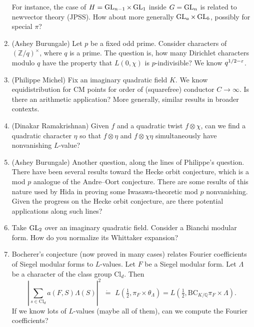 \documentclass[reqno]{amsart} 
\begin{document}
\begin{enumerate}
  For instance, the case of $H = \operatorname{GL}_{n-1} \times \operatorname{GL}_1$ inside $G = \operatorname{GL}_{n}$ is related to newvector theory (JPSS).  How about more generally $\operatorname{GL}_a \times \operatorname{GL}_b$, possibly for special $\pi$?
\item\label{enumerate:cnej3kgqgj} (Ashey Burungale) Let $p$ be a fixed odd prime.  Consider characters of $(\mathbb{Z} / q)^\times$, where $q$ is a prime.  The question is, how many Dirichlet characters modulo $q$ have the property that $L(0, \chi )$ is $p$-indivisible?  We know $q^{1/2 - \varepsilon}$.
\item\label{enumerate:cnej3kgrc4} (Philippe Michel) Fix an imaginary quadratic field $K$.  We know equidistribution for CM points for order of (squarefree) conductor $C \rightarrow \infty$.  Is there an arithmetic application?  More generally, similar results in broader contexts.
\item\label{enumerate:cnej3kgr45} (Dinakar Ramakrishnan) Given $f$ and a quadratic twist $f \otimes \chi$, can we find a quadratic character $\eta$ so that $f \otimes \eta$ and $f \otimes \chi \eta$ simultaneously have nonvanishing $L$-value?
\item\label{enumerate:cnej3kgsw6} (Ashey Burungale) Another question, along the lines of Philippe's question.  There have been several results toward the Hecke orbit conjecture, which is a mod $p$ analogue of the Andre--Oort conjecture.  There are some results of this nature used by Hida in proving some Iwasawa-theoretic mod $p$ nonvanishing.  Given the progress on the Hecke orbit conjecture, are there potential applications along such lines?
\item\label{enumerate:cnej3kgmi0} Take $\operatorname{GL}_2$ over an imaginary quadratic field.  Consider a Bianchi modular form.  How do you normalize its Whittaker expansion?
\item\label{enumerate:cnej3kglp3} Bocherer's conjecture (now proved in many cases) relates Fourier coefficients of Siegel modular forms to $L$-values.  Let $F$ be a Siegel modular form.  Let $\Lambda$ be a character of the class group $\mathrm{Cl}_d$.  Then
  \begin{equation*}
    \left\lvert \sum_{s \in \mathrm{Cl}_d } a(F, S) \Lambda(S)  \right\rvert^2
    \,\, \dot{=} \,\,
    L(\tfrac{1}{2}, \pi_F \times \theta_\Lambda)
    =
    L(\tfrac{1}{2}, \mathrm{BC}_{K/\mathbb{Q}} \pi_F \times \Lambda).
  \end{equation*}
  If we know lots of $L$-values (maybe all of them), can we compute the Fourier coefficients?


\end{enumerate}
\end{document}
